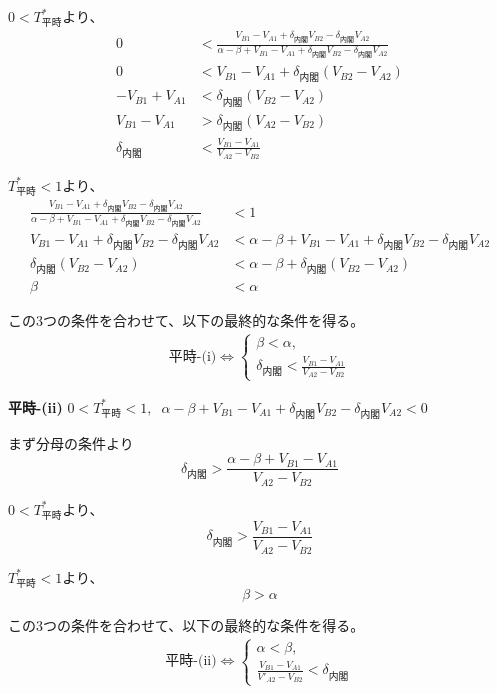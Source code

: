 \documentclass[main.tex]{subfiles}
\begin{document}
$0<T^*_{平時}$より、
\begin{align*}
    0 &< \frac{ V_{B1} - V_{A1} +\delta_{内閣}V_{B2} - \delta_{内閣}V_{A2} }{ \alpha-\beta + V_{B1}-V_{A1} + \delta_{内閣}V_{B2} - \delta_{内閣}V_{A2} }\\
    0 &<  V_{B1} - V_{A1} +\delta_{内閣}(V_{B2} - V_{A2})\\
    -V_{B1} + V_{A1} &< \delta_{内閣}(V_{B2} - V_{A2})\\
    V_{B1} - V_{A1} &> \delta_{内閣}(V_{A2} - V_{B2})\\
    \delta_{内閣} &< \frac{V_{B1} - V_{A1}}{V_{A2} - V_{B2}}
\end{align*}


$T^*_{平時}<1$より、
\begin{align*}
    \frac{ V_{B1} - V_{A1} +\delta_{内閣}V_{B2} - \delta_{内閣}V_{A2} }{ \alpha-\beta + V_{B1}-V_{A1} + \delta_{内閣}V_{B2} - \delta_{内閣}V_{A2} } &< 1\\
    V_{B1} - V_{A1} +\delta_{内閣}V_{B2} - \delta_{内閣}V_{A2} &< \alpha-\beta + V_{B1}-V_{A1} + \delta_{内閣}V_{B2} - \delta_{内閣}V_{A2}\\
    \delta_{内閣}(V_{B2} - V_{A2}) &< \alpha-\beta + \delta_{内閣}(V_{B2} - V_{A2})\\
    \beta &< \alpha
\end{align*}


この3つの条件を合わせて、以下の最終的な条件を得る。
\begin{align*}
    \text{平時-(i)} \Leftrightarrow 
    \begin{cases}
        \beta < \alpha, \\
        \delta_{内閣} < \frac{V_{B1} - V_{A1}}{V_{A2} - V_{B2}}
    \end{cases}
\end{align*}



\bigskip
\noindent
\textbf{平時-(ii)}\; $0<T^*_{平時}<1,\;\; \alpha-\beta + V_{B1}-V_{A1} + \delta_{内閣}V_{B2} - \delta_{内閣}V_{A2}　< 0$

まず分母の条件より
$$\delta_{内閣} > \frac{\alpha-\beta + V_{B1}-V_{A1}}{V_{A2} - V_{B2}}$$

$0<T^*_{平時}$より、
$$\delta_{内閣} > \frac{V_{B1} - V_{A1}}{V_{A2} - V_{B2}}$$

$T^*_{平時}<1$より、
$$\beta > \alpha$$

この3つの条件を合わせて、以下の最終的な条件を得る。
\begin{align*}
    \text{平時-(ii)} \Leftrightarrow 
    \begin{cases}
        \alpha < \beta, \\
        \frac{V_{B1}-V_{A1}}{V'_{A2} - V_{B2}} < \delta_{内閣}
    \end{cases}
\end{align*}
\end{document}
